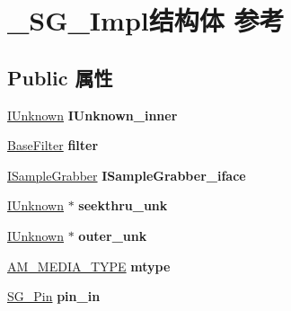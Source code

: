 \hypertarget{struct___s_g___impl}{}\section{\+\_\+\+S\+G\+\_\+\+Impl结构体 参考}
\label{struct___s_g___impl}
\subsection*{Public 属性}
\begin{DoxyCompactItemize}
\item 
\mbox{\label{struct___s_g___impl_acfcb397566f13365a1b1f39d57f582b5}} 
\hyperlink{interface_i_unknown}{I\+Unknown} {\bfseries I\+Unknown\+\_\+inner}
\item 
\mbox{\label{struct___s_g___impl_aeeb9cca48d55cec0bfc8b0e88a229f5f}} 
\hyperlink{struct_base_filter}{Base\+Filter} {\bfseries filter}
\item 
\mbox{\label{struct___s_g___impl_ae0e71b8a7e5503c6df74114944264ead}} 
\hyperlink{interface_i_sample_grabber}{I\+Sample\+Grabber} {\bfseries I\+Sample\+Grabber\+\_\+iface}
\item 
\mbox{\label{struct___s_g___impl_a7bcd6389b824b0fac53bd77cd52acc52}} 
\hyperlink{interface_i_unknown}{I\+Unknown} $\ast$ {\bfseries seekthru\+\_\+unk}
\item 
\mbox{\label{struct___s_g___impl_acbf67fc91aed5ffc0277251904329ce1}} 
\hyperlink{interface_i_unknown}{I\+Unknown} $\ast$ {\bfseries outer\+\_\+unk}
\item 
\mbox{\label{struct___s_g___impl_a044908d6409ede1d69f918f3c52773af}} 
\hyperlink{struct_a_m___m_e_d_i_a___t_y_p_e}{A\+M\+\_\+\+M\+E\+D\+I\+A\+\_\+\+T\+Y\+PE} {\bfseries mtype}
\item 
\mbox{\label{struct___s_g___impl_ad4a2464ad10be50b450215eb7bc5e497}} 
\hyperlink{struct___s_g___pin}{S\+G\+\_\+\+Pin} {\bfseries pin\+\_\+in}
\item 
\mbox{\label{struct___s_g___impl_ac435620171e0a4da90265607cb68e186}} 

\end{DoxyCompactItemize}
